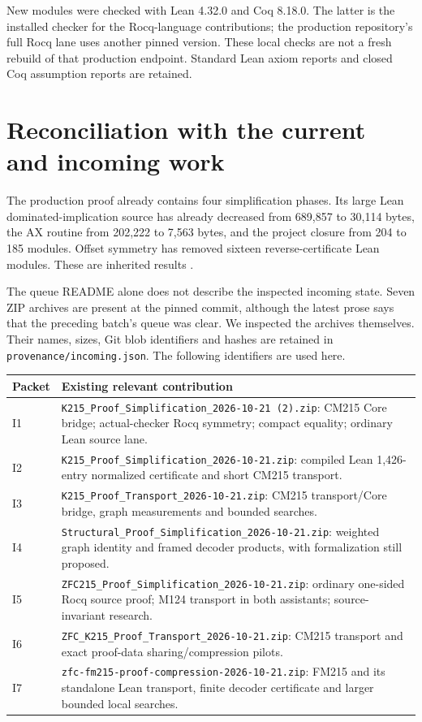 \documentclass[11pt]{article}
\newcommand{\code}[1]{\texttt{\small #1}}
\begin{document}
New modules were checked with Lean 4.32.0 and Coq 8.18.0. The latter is the
installed checker for the Rocq-language contributions; the production
repository's full Rocq lane uses another pinned version. These local checks
are not a fresh rebuild of that production endpoint. Standard Lean axiom
reports and closed Coq assumption reports are retained.

\section{Reconciliation with the current and incoming work}

The production proof already contains four simplification phases. Its large
Lean dominated-implication source has already decreased from 689,857 to 30,114
bytes, the AX routine from 202,222 to 7,563 bytes, and the project closure from
204 to 185 modules. Offset symmetry has removed sixteen reverse-certificate
Lean modules. These are inherited results \cite{production}.

The queue README alone does not describe the inspected incoming state. Seven
ZIP archives are present at the pinned commit, although the latest prose says
that the preceding batch's queue was clear. We inspected the archives
themselves. Their names, sizes, Git blob identifiers and hashes are retained in
\code{provenance/incoming.json}. The following identifiers are used here.

\begin{longtable}{@{}p{}p{}@{}}
\toprule
Packet & Existing relevant contribution\\
\midrule
\endhead
I1 & \code{K215\_Proof\_Simplification\_2026-10-21 (2).zip}: CM215 Core bridge; actual-checker Rocq symmetry; compact equality; ordinary Lean source lane.\\
I2 & \code{K215\_Proof\_Simplification\_2026-10-21.zip}: compiled Lean 1,426-entry normalized certificate and short CM215 transport.\\
I3 & \code{K215\_Proof\_Transport\_2026-10-21.zip}: CM215 transport/Core bridge, graph measurements and bounded searches.\\
I4 & \code{Structural\_Proof\_Simplification\_2026-10-21.zip}: weighted graph identity and framed decoder products, with formalization still proposed.\\
I5 & \code{ZFC215\_Proof\_Simplification\_2026-10-21.zip}: ordinary one-sided Rocq source proof; M124 transport in both assistants; source-invariant research.\\
I6 & \code{ZFC\_K215\_Proof\_Transport\_2026-10-21.zip}: CM215 transport and exact proof-data sharing/compression pilots.\\
I7 & \code{zfc-fm215-proof-compression-2026-10-21.zip}: FM215 and its standalone Lean transport, finite decoder certificate and larger bounded local searches.\\
\bottomrule
\end{longtable}
\end{document}

